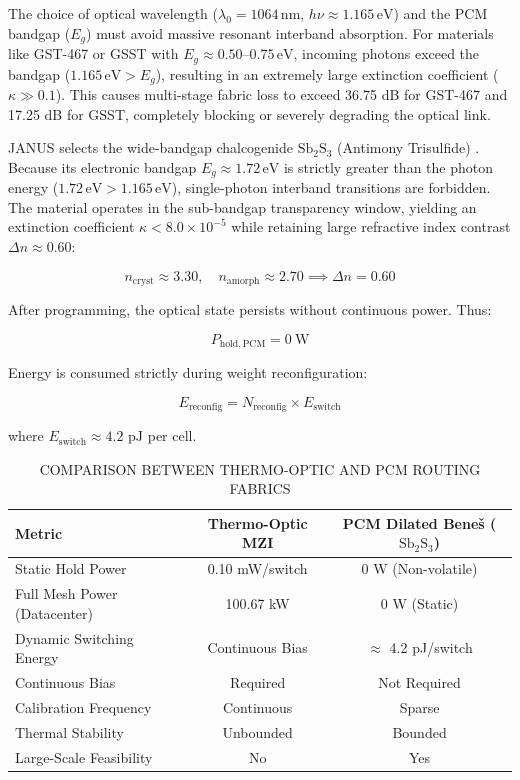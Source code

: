 \documentclass[journal]{IEEEtran}
\begin{document}
The choice of optical wavelength ($\lambda_0 = 1064\,\mathrm{nm}$, $h\nu \approx 1.165\,\mathrm{eV}$) and the PCM bandgap ($E_g$) must avoid massive resonant interband absorption. For materials like GST-467 or GSST with $E_g \approx 0.50\text{--}0.75\,\mathrm{eV}$, incoming photons exceed the bandgap ($1.165\,\mathrm{eV} > E_g$), resulting in an extremely large extinction coefficient ($\kappa \gg 0.1$). This causes multi-stage fabric loss to exceed 36.75 dB for GST-467 and 17.25 dB for GSST, completely blocking or severely degrading the optical link.

JANUS selects the wide-bandgap chalcogenide $\mathrm{Sb_2S_3}$ (Antimony Trisulfide) \cite{Delaney2020}. Because its electronic bandgap $E_g \approx 1.72\,\mathrm{eV}$ is strictly greater than the photon energy ($1.72\,\mathrm{eV} > 1.165\,\mathrm{eV}$), single-photon interband transitions are forbidden. The material operates in the sub-bandgap transparency window, yielding an extinction coefficient $\kappa < 8.0 \times 10^{-5}$ while retaining large refractive index contrast $\Delta n \approx 0.60$:

\begin{equation}
n_{\mathrm{cryst}} \approx 3.30, \quad n_{\mathrm{amorph}} \approx 2.70 \implies \Delta n = 0.60
\end{equation}

After programming, the optical state persists without continuous power. Thus:

\begin{equation}
P_{\mathrm{hold,PCM}} = 0~\mathrm{W}
\end{equation}

Energy is consumed strictly during weight reconfiguration:

\begin{equation}
E_{\mathrm{reconfig}} = N_{\mathrm{reconfig}} \times E_{\mathrm{switch}}
\end{equation}

where $E_{\mathrm{switch}} \approx 4.2\text{ pJ}$ per cell.

\begin{table}[htbp]
\centering
\small
\setlength{\tabcolsep}{1pt}
\caption{COMPARISON BETWEEN THERMO-OPTIC AND PCM ROUTING FABRICS}
\label{tab:table4}
\begin{tabular}{lcc}
\toprule
Metric & Thermo-Optic MZI & PCM Dilated Bene\v{s} ($\mathrm{Sb_2S_3}$) \\
\midrule
Static Hold Power & 0.10 mW/switch & 0 W (Non-volatile) \\
Full Mesh Power (Datacenter) & 100.67 kW & 0 W (Static) \\
Dynamic Switching Energy & Continuous Bias & $\approx$ 4.2 pJ/switch \\
Continuous Bias & Required & Not Required \\
Calibration Frequency & Continuous & Sparse \\
Thermal Stability & Unbounded & Bounded \\
Large-Scale Feasibility & No & Yes \\
\bottomrule
\end{tabular}
\end{table}
\end{document}
